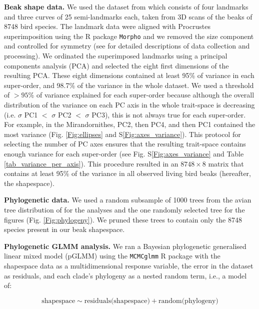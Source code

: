 \documentclass[12pt,letterpaper]{article}
\begin{document}
\textbf{Beak shape data.}
We used the dataset from \cite{cooney2017mega,chira2020signature,hughes2022global} which consists of four landmarks and three curves of 25 semi-landmarks each, taken from 3D scans of  the beaks of 8748 bird species.
The landmark data were aligned with Procrustes superimposition using the R package \texttt{Morpho} \cite{Rcore,Morpho} and we removed the size component and controlled for symmetry (see \cite{cooney2017mega,chira2020signature,hughes2022global} for detailed descriptions of data collection and processing).
We ordinated the superimposed landmarks using a principal components analysis (PCA) and selected the eight first dimensions of the resulting PCA.
These eight dimensions contained at least 95\% of variance in each super-order, and 98.7\% of the variance in the whole dataset.
We used a threshold of $>95$\% of variance explained for each super-order because although the overall distribution of the variance on each PC axis in the whole trait-space is decreasing (i.e.
$\sigma$ PC1 $<$ $\sigma$ PC2 $<$ $\sigma$ PC3), this is not always true for each super-order.
For example, in the Mirandornithes, PC2, then PC4, and then PC1 contained the most variance (Fig. \ref{Fig:ellipses} and S\ref{Fig:axes_variance}).
This protocol for selecting the number of PC axes ensures that the resulting trait-space contains enough variance for each super-order (see Fig. S\ref{Fig:axes_variance} and Table \ref{tab_variance_per_axis}).
This procedure resulted in an $8748 \times 8$ matrix that contains at least 95\% of the variance in all observed living bird beaks (hereafter, the shapespace).

\textbf{Phylogenetic data.}
We used a random subsample of 1000 trees from the avian tree distribution of \cite{jetz2012global} for the analyses and the one randomly selected tree for the figures (Fig. \ref{Fig:phylogeny}).
We pruned these trees to contain only the 8748 species present in our beak shapespace.

\textbf{Phylogenetic GLMM analysis.}
We ran a Bayesian phylogenetic generalised linear mixed model (pGLMM) using the \texttt{MCMCglmm} R package \cite{MCMCglmm} with the shapespace data as a multidimensional response variable, the error in the dataset as residuals, and each clade's phylogeny as a nested random term, i.e., a model of:

\begin{equation}
\text{shapespace} \mathtt{\sim} \text{residuals(shapespace)} + \text{random(phylogeny)}
\end{equation}
\end{document}
